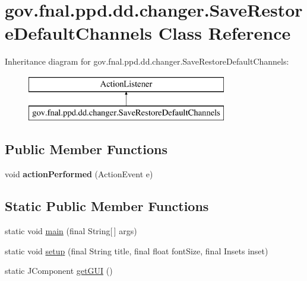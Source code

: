 \hypertarget{classgov_1_1fnal_1_1ppd_1_1dd_1_1changer_1_1SaveRestoreDefaultChannels}{\section{gov.\-fnal.\-ppd.\-dd.\-changer.\-Save\-Restore\-Default\-Channels Class Reference}
\label{classgov_1_1fnal_1_1ppd_1_1dd_1_1changer_1_1SaveRestoreDefaultChannels}
}
Inheritance diagram for gov.\-fnal.\-ppd.\-dd.\-changer.\-Save\-Restore\-Default\-Channels\-:\begin{figure}[H]
\begin{center}
\leavevmode
\includegraphics[height=2.000000cm]{classgov_1_1fnal_1_1ppd_1_1dd_1_1changer_1_1SaveRestoreDefaultChannels}
\end{center}
\end{figure}
\subsection*{Public Member Functions}
\begin{DoxyCompactItemize}
\item 
\hypertarget{classgov_1_1fnal_1_1ppd_1_1dd_1_1changer_1_1SaveRestoreDefaultChannels_a8e4454a41c73b5fbe25212626574c507}{void {\bfseries action\-Performed} (Action\-Event e)}\label{classgov_1_1fnal_1_1ppd_1_1dd_1_1changer_1_1SaveRestoreDefaultChannels_a8e4454a41c73b5fbe25212626574c507}

\end{DoxyCompactItemize}
\subsection*{Static Public Member Functions}
\begin{DoxyCompactItemize}
\item 
static void \hyperlink{classgov_1_1fnal_1_1ppd_1_1dd_1_1changer_1_1SaveRestoreDefaultChannels_a49e137fa18de819556f440e577400af5}{main} (final String\mbox{[}$\,$\mbox{]} args)
\item 
static void \hyperlink{classgov_1_1fnal_1_1ppd_1_1dd_1_1changer_1_1SaveRestoreDefaultChannels_a42ec751770b045c82c3719d78980ccba}{setup} (final String title, final float font\-Size, final Insets inset)
\item 
static J\-Component \hyperlink{classgov_1_1fnal_1_1ppd_1_1dd_1_1changer_1_1SaveRestoreDefaultChannels_ac4d9cc40872b340a1a198a72dcdc3891}{get\-G\-U\-I} ()
\end{DoxyCompactItemize}
